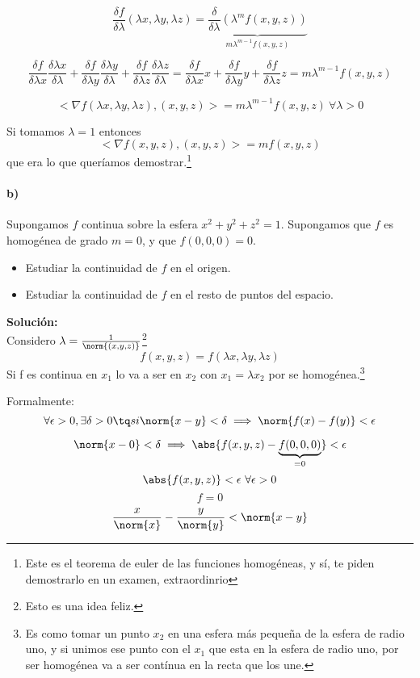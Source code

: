 $$\frac{\delta f}{\delta \lambda}(\lambda x, \lambda y, \lambda z) = \underbrace{\frac{\delta}{\delta \lambda}(\lambda^mf(x,y,z))}_{m\lambda^{m-1}f(x,y,z)}$$

$$\frac{\delta f}{\delta \lambda x}\frac{\delta \lambda x}{\delta \lambda} + \frac{\delta f}{\delta \lambda y}\frac{\delta \lambda y}{\delta \lambda} + \frac{\delta f}{\delta \lambda z}\frac{\delta \lambda z}{\delta \lambda} = \frac{\delta f}{\delta \lambda x}x + \frac{\delta f}{\delta \lambda y}y + \frac{\delta f}{\delta \lambda z}z = m\lambda ^{m-1} f(x,y,z) $$

$$<\nabla f(\lambda x,\lambda y,\lambda z), (x,y,z) > = m\lambda^{m-1} f(x,y,z)\ \forall \lambda > 0$$

Si tomamos $\lambda = 1$ entonces $$<\nabla f(x,y,z), (x,y,z) > = mf(x,y,z)$$ que era lo que queríamos demostrar.\footnote{Este es el teorema de euler de las funciones homogéneas, y sí, te piden demostrarlo en un examen, extraordinrio}

\paragraph{b)} Supongamos $f$ continua sobre la esfera ${x^2+y^2+z^2=1}$. Supongamos que $f$ es homogénea de grado $m = 0$, y que $f(0,0,0) = 0$.

\begin{itemize}
\item Estudiar la continuidad de $f$ en el origen.
\item Estudiar la continuidad de $f$ en el resto de puntos del espacio.
\end{itemize}

\textbf{Solución:}\\
Considero $\lambda = \frac{1}{\norm{(x,y,z)}}$\footnote{Esto es una idea feliz.}\\
$$f(x,y,z) = f(\lambda x, \lambda y, \lambda z)$$
Si f es continua en $x_1$ lo va a ser en $x_2$ con $x_1 = \lambda x_2$ por se homogénea.\footnote{Es como tomar un punto $x_2$ en una esfera más pequeña de la esfera de radio uno, y si unimos ese punto con el $x_1$ que esta en la esfera de radio uno, por ser homogénea va a ser contínua en la recta que los une.}

Formalmente:
$$\forall \epsilon > 0, \exists \delta > 0 \tq si \norm{x-y} < \delta \implies \norm{f(x) - f(y)} < \epsilon$$

$$\norm{x - 0} < \delta \implies \abs{f(x,y,z) - \underbrace{f(0,0,0)}_{=0}} < \epsilon$$
$$\abs{f(x,y,z)} < \epsilon\ \forall \epsilon > 0$$
$$ f = 0$$
$$ \frac{x}{\norm{x}} - \frac{y}{\norm{y}} < \norm{x-y}$$



